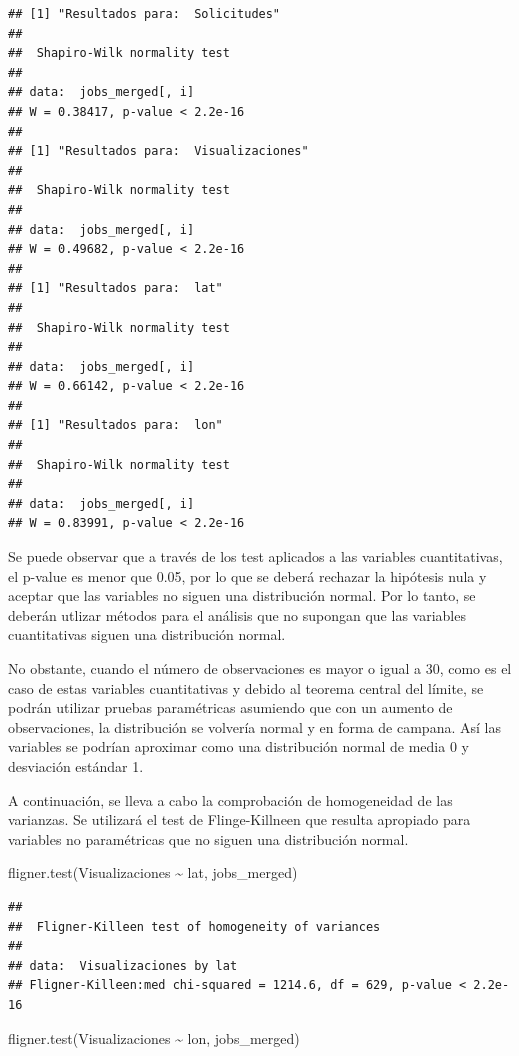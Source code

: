\documentclass[
]{article}
\newenvironment{Shaded}{\begin{snugshade}}{\end{snugshade}}
\newcommand{\KeywordTok}[1]{\textcolor[rgb]{0.94,0.87,0.69}{#1}}
\newcommand{\NormalTok}[1]{\textcolor[rgb]{0.80,0.80,0.80}{#1}}
\newcommand{\OperatorTok}[1]{\textcolor[rgb]{0.94,0.94,0.82}{#1}}
\newcommand{\StringTok}[1]{\textcolor[rgb]{0.80,0.58,0.58}{#1}}
\begin{document}
\begin{verbatim}
## [1] "Resultados para:  Solicitudes"
## 
##  Shapiro-Wilk normality test
## 
## data:  jobs_merged[, i]
## W = 0.38417, p-value < 2.2e-16
## 
## [1] "Resultados para:  Visualizaciones"
## 
##  Shapiro-Wilk normality test
## 
## data:  jobs_merged[, i]
## W = 0.49682, p-value < 2.2e-16
## 
## [1] "Resultados para:  lat"
## 
##  Shapiro-Wilk normality test
## 
## data:  jobs_merged[, i]
## W = 0.66142, p-value < 2.2e-16
## 
## [1] "Resultados para:  lon"
## 
##  Shapiro-Wilk normality test
## 
## data:  jobs_merged[, i]
## W = 0.83991, p-value < 2.2e-16
\end{verbatim}

Se puede observar que a través de los test aplicados a las variables
cuantitativas, el p-value es menor que 0.05, por lo que se deberá
rechazar la hipótesis nula y aceptar que las variables no siguen una
distribución normal. Por lo tanto, se deberán utlizar métodos para el
análisis que no supongan que las variables cuantitativas siguen una
distribución normal.

No obstante, cuando el número de observaciones es mayor o igual a 30,
como es el caso de estas variables cuantitativas y debido al teorema
central del límite, se podrán utilizar pruebas paramétricas asumiendo
que con un aumento de observaciones, la distribución se volvería normal
y en forma de campana. Así las variables se podrían aproximar como una
distribución normal de media 0 y desviación estándar 1.

A continuación, se lleva a cabo la comprobación de homogeneidad de las
varianzas. Se utilizará el test de Flinge-Killneen que resulta apropiado
para variables no paramétricas que no siguen una distribución normal.

\begin{Shaded}
\begin{Highlighting}[]
\KeywordTok{fligner.test}\NormalTok{(Visualizaciones }\OperatorTok{\textasciitilde{}}\StringTok{ }\NormalTok{lat, jobs\_merged)}
\end{Highlighting}
\end{Shaded}

\begin{verbatim}
## 
##  Fligner-Killeen test of homogeneity of variances
## 
## data:  Visualizaciones by lat
## Fligner-Killeen:med chi-squared = 1214.6, df = 629, p-value < 2.2e-16
\end{verbatim}

\begin{Shaded}
\begin{Highlighting}[]
\KeywordTok{fligner.test}\NormalTok{(Visualizaciones }\OperatorTok{\textasciitilde{}}\StringTok{ }\NormalTok{lon, jobs\_merged)}
\end{Highlighting}
\end{Shaded}
\end{document}
